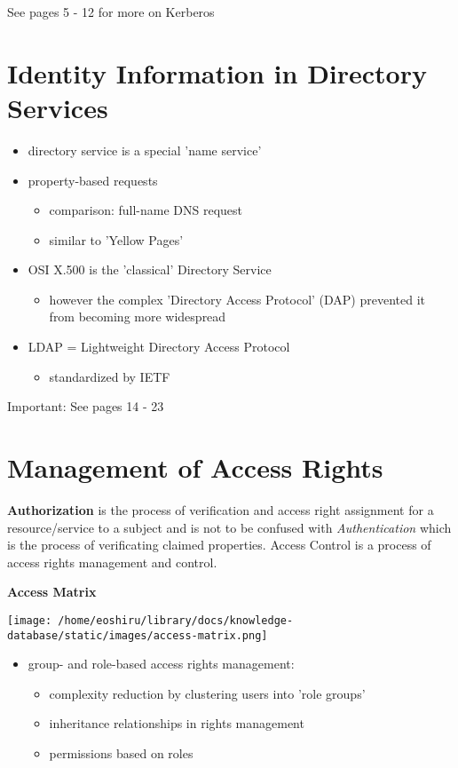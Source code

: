 \documentclass[11pt]{article}
\begin{document}
See pages 5 - 12 for more on Kerberos

\section{Identity Information in Directory Services}
\label{sec:org480c9f8}
\begin{itemize}
\item directory service is a special 'name service'
\item property-based requests
\begin{itemize}
\item comparison: full-name DNS request
\item similar to 'Yellow Pages'
\end{itemize}
\item OSI X.500 is the 'classical' Directory Service
\begin{itemize}
\item however the complex 'Directory Access Protocol' (DAP) prevented it from becoming more widespread
\end{itemize}
\item LDAP = Lightweight Directory Access Protocol
\begin{itemize}
\item standardized by IETF
\end{itemize}
\end{itemize}

Important: See pages 14 - 23
\section{Management of Access Rights}
\label{sec:org22973b3}
\textbf{Authorization} is the process of verification and access right assignment for a resource/service to a subject and is not to be confused with \emph{Authentication} which is the process of verificating claimed properties. Access Control is a process of access rights management and control.

\textbf{Access Matrix}\\
\begin{center}
\texttt{[image: /home/eoshiru/library/docs/knowledge-database/static/images/access-matrix.png]}
\end{center}
\begin{itemize}
\item group- and role-based access rights management:
\begin{itemize}
\item complexity reduction by clustering users into 'role groups'
\item inheritance relationships in rights management
\item permissions based on roles
\end{itemize}
\end{itemize}
\end{document}
